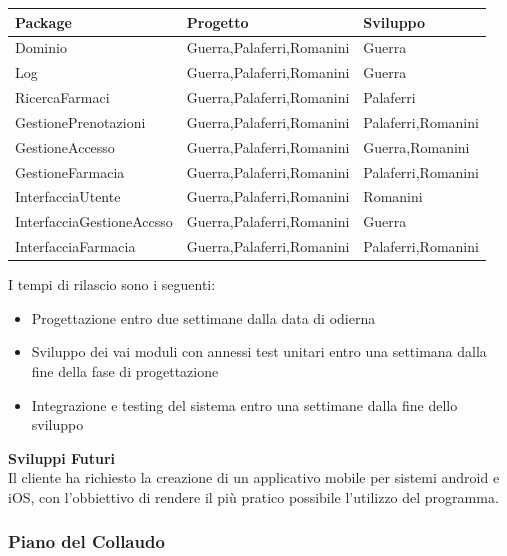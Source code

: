 \begin{tabular} {|P{5cm}|P{5cm}|P{5cm}|} %
    \hline
    \textbf{Package} & \textbf{Progetto} & \textbf{Sviluppo} \\
    \hline
    Dominio  &  Guerra,Palaferri,Romanini  &  Guerra\\
    \hline
    Log  &  Guerra,Palaferri,Romanini & Guerra\\
    \hline
    RicercaFarmaci  &  Guerra,Palaferri,Romanini &  Palaferri \\
    \hline
    GestionePrenotazioni  & Guerra,Palaferri,Romanini & Palaferri,Romanini \\
    \hline
    GestioneAccesso  & Guerra,Palaferri,Romanini & Guerra,Romanini \\
    \hline
    GestioneFarmacia  & Guerra,Palaferri,Romanini & Palaferri,Romanini \\
    \hline
    InterfacciaUtente  & Guerra,Palaferri,Romanini & Romanini \\
    \hline
    InterfacciaGestioneAccsso  & Guerra,Palaferri,Romanini & Guerra\\
    \hline
    InterfacciaFarmacia  & Guerra,Palaferri,Romanini & Palaferri,Romanini \\
    \hline
\end{tabular}
\hfill \break

I tempi di rilascio sono i seguenti:
\begin{itemize}
    \item Progettazione entro due settimane dalla data di odierna
    \item Sviluppo dei vai moduli con annessi test unitari entro una settimana dalla fine della fase di progettazione
    \item Integrazione e testing del sistema entro una settimane dalla fine dello sviluppo
\end{itemize}
\hfill \break

\textbf{Sviluppi Futuri}
\\

Il cliente ha richiesto la creazione di un applicativo mobile per sistemi
android e iOS, con l'obbiettivo di rendere il più pratico possibile l'utilizzo
del programma.

\newpage
\subsubsection{Piano del Collaudo}


